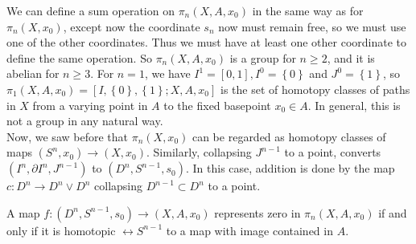  We can define a sum operation on $\pi_n \left( X, A, x_0 \right) $ 
  in the same way as for $\pi_n \left( X, x_0 \right) $, except
  now the coordinate $s_n$ now must remain free, so
  we must use one of the other coordinates. Thus
  we must have at least one other coordinate to define
  the same operation. So $\pi_n \left( X, A, x_0 \right) $ is
  a group for $n\ge 2$, and it is abelian for
  $n\ge 3$. For $n=1$, we have
  $I^{1} = \left[ 0,1 \right] , I^{0} = \left\{ 0 \right\} $ 
  and $J^{0} = \left\{ 1 \right\} $, so
  $\pi_1 \left( X, A, x_0 \right) 
  = \left[ I, \left\{ 0 \right\} , \left\{ 1 \right\} ;
  X, A, x_0 \right] $ is the set of homotopy classes of paths in
  $X$ from a varying point in $A$ to the fixed basepoint
  $x_0 \in A$. In general, this is not a group in any
  natural way. \\
  \linebreak
  Now, we saw before that
  $\pi_n \left( X, x_0 \right) $ can be regarded as
  homotopy classes of maps $\left( S^{n}, x_0 \right) \to 
  \left( X, x_0 \right) $. Similarly, collapsing
  $J^{n-1}$ to a point, converts
  $\left( I^{n} , \partial I^{n}, J^{n-1} \right) $ 
  to $\left( D^{n}, S^{n-1}, s_0 \right) $.
  In this case, addition is done by
  the map $c \colon D^{n} \to D^{n} \vee D^{n}$ collapsing
  $D^{n-1} \subset D^{n}$ to a point.\\
  \linebreak
  \begin{theorem}\label{Thm:Compression}
      A map $f \colon \left( D^{n}, S^{n-1}, s_0 \right) 
      \to \left( X, A, x_0 \right) $ represents zero
      in $\pi_n \left( X, A, x_0 \right) $ if and only if
      it is homotopic $\rel S^{n-1}$ to a map with image
      contained in $A$.
  \end{theorem}
  
